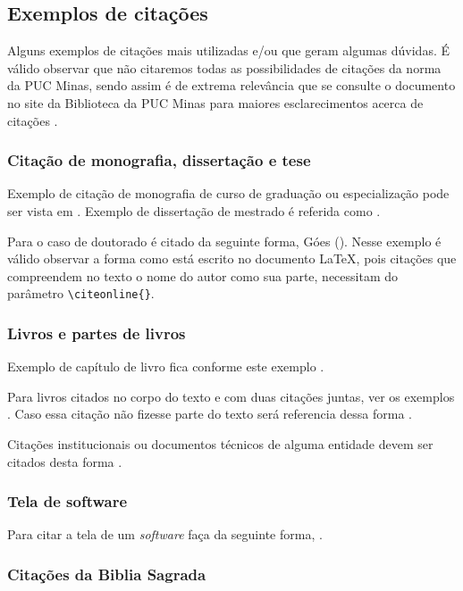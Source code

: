 \subsection{\esp Exemplos de citações} 

Alguns exemplos de citações mais utilizadas e/ou que geram algumas dúvidas. É válido observar que não citaremos
todas as possibilidades de citações da norma da PUC Minas, sendo assim é de extrema relevância que se consulte 
o documento no site da Biblioteca da PUC Minas para maiores esclarecimentos acerca de citações \cite{manualpuc}.

\subsubsection{\esp Citação de monografia, dissertação e tese}

Exemplo de citação de monografia de curso de graduação ou especialização pode ser vista em .
Exemplo de dissertação de mestrado é referida como .

Para o caso de doutorado é citado da seguinte forma, Góes (\citeyear{tese}). Nesse exemplo é válido observar a forma
como está escrito no documento \LaTeX, pois citações que compreendem no texto o nome do autor como sua parte, necessitam 
do parâmetro \verb$\citeonline{}$. 

\subsubsection{\esp Livros e partes de livros}

Exemplo de capítulo de livro fica conforme este exemplo \cite{cap-livro}.

Para livros citados no corpo do texto e com duas citações juntas, ver os exemplos .
Caso essa citação não fizesse parte do texto será referencia dessa forma \cite{knuth,groupp}.

Citações institucionais ou documentos técnicos de alguma entidade devem ser citados desta forma \cite{pmbok}.

\subsubsection{\esp Tela de software}

Para  citar a tela de um \textit{software} faça da seguinte forma, .

\subsubsection{\esp Citações da Biblia Sagrada}

